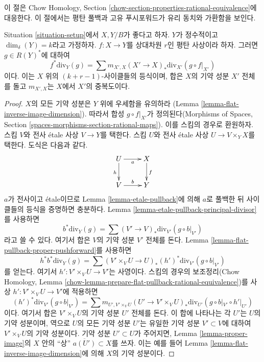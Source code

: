 \noindent
이 절은 Chow Homology, Section
\ref{chow-section-properties-rational-equivalence}에 대응한다.
이 절에서는 평탄 풀백과 고유 푸시포워드가 유리 동치와 가환함을 보인다.

\begin{lemma}
\label{lemma-prepare-flat-pullback-rational-equivalence}
Situation \ref{situation-setup}에서 $X, Y/B$가 좋다고 하자.
$Y$가 정수적이고 $\dim_\delta(Y) = k$라고 가정하자.
$f : X \to Y$를 상대차원 $r$인 평탄 사상이라 하자.
그러면 $g \in R(Y)^*$에 대하여
$$
f^*\text{div}_Y(g) =
\sum m_{X', X} (X' \to X)_*\text{div}_{X'}(g \circ f|_{X'})
$$
이다. 이는 $X$ 위의 $(k + r - 1)$-사이클들의 등식이며, 합은
$X$의 기약 성분 $X'$ 전체를 돌고 $m_{X', X}$는 $X$에서 $X'$의
중복도이다.
\end{lemma}

\begin{proof}
$X$의 모든 기약 성분은 $Y$ 위에 우세함을 유의하라
(Lemma \ref{lemma-flat-inverse-image-dimension}). 따라서 합성
$g \circ f|_{X'}$가 정의된다(Morphisms of Spaces, Section
\ref{spaces-morphisms-section-rational-maps}).
이를 스킴의 경우로 환원하자. 스킴 $V$와 전사 \'etale 사상
$V \to Y$를 택한다. 스킴 $U$와 전사 \'etale 사상
$U \to V \times_Y X$를 택한다. 도식은 다음과 같다.
$$
\xymatrix{
U \ar[r]_a \ar[d]_h & X \ar[d]^f \\
V \ar[r]^b & Y
}
$$
$a$가 전사이고 \'etale이므로 Lemma \ref{lemma-etale-pullback}에
의해 $a$로 풀백한 뒤 사이클들의 등식을 증명하면 충분하다.
Lemma \ref{lemma-etale-pullback-principal-divisor}를 사용하면
$$
b^*\text{div}_Y(g) = \sum (V' \to V)_*\text{div}_{V'}(g \circ b|_{V'})
$$
라고 쓸 수 있다. 여기서 합은 $V$의 기약 성분 $V'$ 전체를 돈다.
Lemma \ref{lemma-flat-pullback-proper-pushforward}를 사용하면
$$
h^*b^*\text{div}_Y(g) =
\sum (V' \times_V U \to U)_*(h')^*\text{div}_{V'}(g \circ b|_{V'})
$$
를 얻는다. 여기서 $h' : V' \times_V U \to V'$는 사영이다.
스킴의 경우의 보조정리(Chow Homology, Lemma
\ref{chow-lemma-prepare-flat-pullback-rational-equivalence})를
사상 $h' : V' \times_V U \to V'$에 적용하면
$$
(h')^*\text{div}_{V'}(g \circ b|_{V'}) =
\sum
m_{U', V' \times_V U}
(U' \to V' \times_V U)_*\text{div}_{U'}(g \circ b|_{V'} \circ h'|_{U'})
$$
이다. 여기서 합은 $V' \times_V U$의 기약 성분 $U'$ 전체를 돈다.
이 합에 나타나는 각 $U'$는 $U$의 기약 성분이며, 역으로 $U$의 모든
기약 성분 $U'$는 유일한 기약 성분 $V' \subset V$에 대하여
$V' \times_V U$의 기약 성분이다. 기약 성분 $U' \subset U$가
주어지면, Lemma \ref{lemma-proper-image}의 $X$ 안의 ``상''
$\overline{a(U')} \subset X$를 쓰자. 이는 예를 들어 Lemma
\ref{lemma-flat-inverse-image-dimension}에 의해 $X$의 기약 성분이다.

\end{proof}
